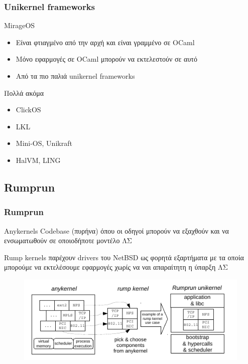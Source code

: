 \documentclass[red,slidestop,notes,compress,mathserif]{beamer}
\begin{document}
\begin{frame}
\frametitle{Unikernel frameworks}
	\begin{block}{MirageOS}
		\begin{itemize}
			\item Είναι φτιαγμένο από την αρχή και είναι γραμμένο σε OCaml
			\item Μόνο εφαρμογές σε OCaml μπορούν να εκτελεστούν σε αυτό
			\item Από τα πιο παλιά unikernel frameworks
		\end{itemize}
	\end{block}
	\pause
	\begin{block}{Πολλά ακόμα}
		\begin{itemize}
			\item ClickOS
			\item LKL
			\item Mini-OS, Unikraft
			\item HalVM, LING
		\end{itemize}
	\end{block}
\end{frame}

\subsection*{Rumprun}
\begin{frame}
\frametitle{Rumprun}
\begin{block}{Anykernels}
	Codebase (πυρήνα) όπου οι οδηγοί μπορούν να εξαχθούν και να ενσωματωθούν σε οποιοδήποτε μοντέλο ΛΣ
\end{block}
\begin{block}{Rump kernels}
	παρέχουν drivers του NetBSD ως φορητά εξαρτήματα με τα οποία μπορούμε να εκτελέσουμε εφαρμογές χωρίς να ναι απαραίτητη η ύπαρξη ΛΣ
\end{block}
\begin{figure}
\center
	\includegraphics[scale=0.5]{figures/from_anykernel_to_rump.png}
\end{figure}
\end{frame}
\end{document}
